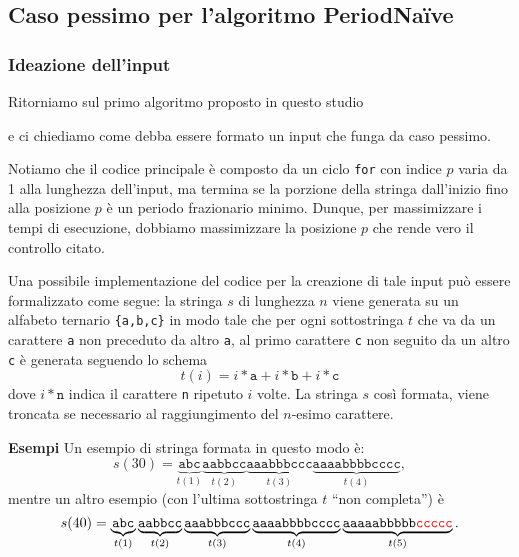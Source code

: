 \documentclass[11pt,a4paper,italian]{article}
\begin{document}
\subsection{Caso pessimo per l'algoritmo PeriodNa{\"i}ve}

\subsubsection{Ideazione dell'input}
Ritorniamo sul primo algoritmo proposto in questo studio
 
e ci chiediamo come debba essere formato un input che funga da caso pessimo.

Notiamo che il codice principale è composto da un ciclo \texttt{for} con indice $p$ varia da 1 alla lunghezza dell'input, ma termina se la porzione della stringa dall'inizio fino alla posizione $p$ è un periodo frazionario minimo. Dunque, per massimizzare i tempi di esecuzione, dobbiamo massimizzare la posizione $p$ che rende vero il controllo citato.

Una possibile implementazione del codice per la creazione di tale input può essere formalizzato come segue: la stringa $s$ di lunghezza $n$ viene generata su un alfabeto ternario \texttt{\{a,b,c\}} in modo tale che per ogni sottostringa $t$ che va da un carattere \texttt{a} non preceduto da altro \texttt{a}, al primo carattere \texttt{c} non seguito da un altro \texttt{c} è generata seguendo lo schema
\begin{equation*}
t(i) = i*\texttt{a} + i*\texttt{b} + i*\texttt{c}
\end{equation*}
dove $i*\texttt{n}$ indica il carattere \texttt{n} ripetuto $i$ volte.
La stringa $s$ così formata, viene troncata se necessario al raggiungimento del $n$-esimo carattere.

\textbf{Esempi} Un esempio di stringa formata in questo modo è:
\begin{equation*}
s(30) = \underbrace{\texttt{abc}}_{t(1)} \underbrace{\texttt{aabbcc}}_{t(2)} \underbrace{\texttt{aaabbbccc}}_{t(3)} \underbrace{\texttt{aaaabbbbcccc}}_{t(4)},
\end{equation*}
mentre un altro esempio (con l'ultima sottostringa $t$ ``non completa'') è
\begin{equation*}
s(40) = \underbrace{\texttt{abc}}_{t(1)} \underbrace{\texttt{aabbcc}}_{t(2)} \underbrace{\texttt{aaabbbccc}}_{t(3)} \underbrace{\texttt{aaaabbbbcccc}}_{t(4)} \underbrace{\texttt{aaaaabbbbb\textcolor{red}{ccccc}}}_{t(5)}.
\end{equation*}
\end{document}
